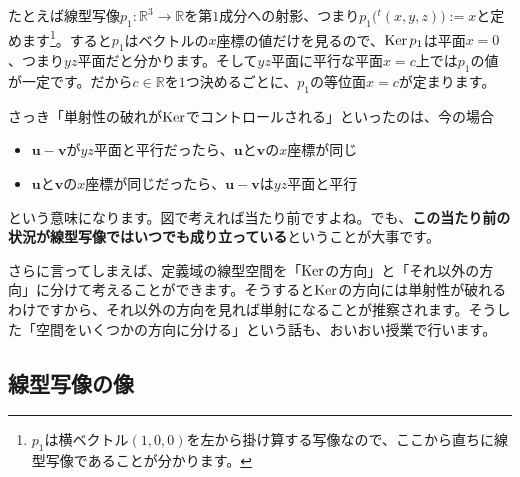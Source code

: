 たとえば線型写像$p_1\colon \mathbb{R}^3 \rightarrow \mathbb{R}$を第$1$成分への射影、つまり$p_1\bigl({}^t(x, y, z)\bigr) := x$と定めます\footnote{$p_1$は横ベクトル$(1, 0, 0)$を左から掛け算する写像なので、ここから直ちに線型写像であることが分かります。}。すると$p_1$はベクトルの$x$座標の値だけを見るので、$\operatorname{Ker} p_1$は平面$x = 0$、つまり$yz$平面だと分かります。そして$yz$平面に平行な平面$x = c$上では$p_1$の値が一定です。だから$c \in \mathbb{R}$を$1$つ決めるごとに、$p_1$の等位面$x = c$が定まります。
\begin{figure}[h!tbp]
\centering
{}
\end{figure}

さっき「単射性の破れが$\operatorname{Ker}$でコントロールされる」といったのは、今の場合
\begin{itemize}
\item $\bm{u} - \bm{v}$が$yz$平面と平行だったら、$\bm{u}$と$\bm{v}$の$x$座標が同じ
\item $\bm{u}$と$\bm{v}$の$x$座標が同じだったら、$\bm{u} - \bm{v}$は$yz$平面と平行
\end{itemize}
という意味になります。図で考えれば当たり前ですよね。でも、\textbf{この当たり前の状況が線型写像ではいつでも成り立っている}ということが大事です。

さらに言ってしまえば、定義域の線型空間を「$\operatorname{Ker}$の方向」と「それ以外の方向」に分けて考えることができます。そうすると$\operatorname{Ker}$の方向には単射性が破れるわけですから、それ以外の方向を見れば単射になることが推察されます。そうした「空間をいくつかの方向に分ける」という話も、おいおい授業で行います。\vspace{-0.5zw}

\subsection{線型写像の像}

